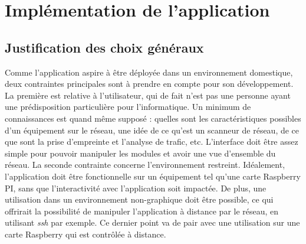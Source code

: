 \documentclass[]{article}
\begin{document}
\section{Implémentation de l'application}


\subsection{Justification des choix généraux}

Comme l'application aspire à être déployée dans un environnement domestique, deux contraintes principales sont à prendre en compte pour son développement. La première est relative à l'utilisateur, qui de fait n'est pas une personne ayant une prédisposition particulière pour l'informatique. Un minimum de connaissances est quand même supposé : quelles sont les caractéristiques possibles d'un équipement sur le réseau, une idée de ce qu'est un scanneur de réseau, de ce que sont la prise d'empreinte et l'analyse de trafic, etc. L'interface doit être assez simple pour pouvoir manipuler les modules et avoir une vue d'ensemble du réseau. La seconde contrainte concerne l'environnement restreint. Idéalement, l'application doit être fonctionnelle sur un équipement tel qu'une carte Raspberry PI, sans que l'interactivité avec l'application soit impactée. De plus, une utilisation dans un environnement non-graphique doit être possible, ce qui offrirait la possibilité de manipuler l'application à distance par le réseau, en utilisant \textit{ssh} par exemple. Ce dernier point va de pair avec une utilisation sur une carte Raspberry qui est contrôlée à distance.\\
\end{document}
